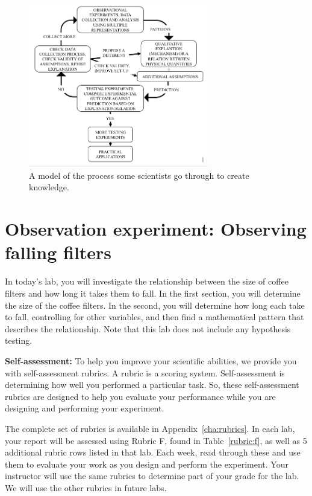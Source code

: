 \begin{figure}
	\centering
	\includegraphics[width=0.7\textwidth]{measurement/islegraphic.png}
	\caption{A model of the process some scientists go through to create knowledge.\cite{etkina_millikan_2015}}\label{me:fig:isle}
\end{figure}

\section*{Observation experiment: Observing falling filters}

In today's lab, you will investigate the relationship between the size of coffee filters and how long it takes them to fall. In the first section, you will determine the size of the coffee filters. In the second, you will determine how long each take to fall, controlling for other variables, and then find a mathematical pattern that describes the relationship. Note that this lab does not include any hypothesis testing.

\begin{framed}
	\textbf{Self-assessment:} To help you improve your scientific abilities, we provide you with self-assessment rubrics.
	A rubric is a scoring system.
	Self-assessment is determining how well you performed a particular task.
	So, these self-assessment rubrics are designed to help you evaluate your performance while you are designing and performing your experiment.
	
	The complete set of rubrics is available in Appendix~\ref{cha:rubrics}.
	In each lab, your report will be assessed using Rubric F, found in Table~\ref{rubric:f}, as well as 5 additional rubric rows listed in that lab.
	Each week, read through these and use them to evaluate your work as you design and perform the experiment.
	Your instructor will use the same rubrics to determine part of your grade for the lab.
	We will use the other rubrics in future labs.
\end{framed}	

